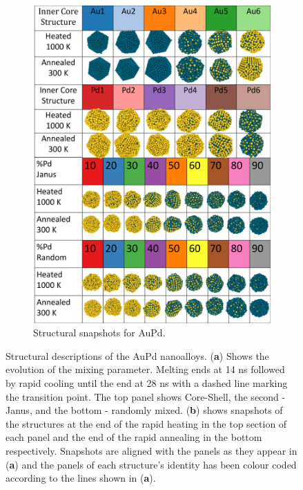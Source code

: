 \begin{figure}
\begin{subfigure}{0.39\textwidth}
    \label{fig:AuPdMix}
\end{subfigure}
\begin{subfigure}{0.56\textwidth}
    \includegraphics[width=\linewidth]{figures/MD/Alloys/AuPd_Struts.pdf}
    \caption{Structural snapshots for AuPd.}
    \label{fig:AuPd_Struts}
\end{subfigure}
    \caption{Structural descriptions of the AuPd nanoalloys. (\textbf{a}) Shows the evolution of the mixing parameter. Melting ends at 14 ns followed by rapid cooling until the end at 28 ns with a dashed line marking the transition point. The top panel shows Core-Shell, the second - Janus, and the bottom - randomly mixed. (\textbf{b}) shows snapshots of the structures at the end of the rapid heating in the top section of each panel and the end of the rapid annealing in the bottom respectively. Snapshots are aligned with the panels as they appear in (\textbf{a}) and the panels of each structure's identity has been colour coded according to the lines shown in (\textbf{a}).}
    \label{fig:AuPd_NA}
\end{figure}


